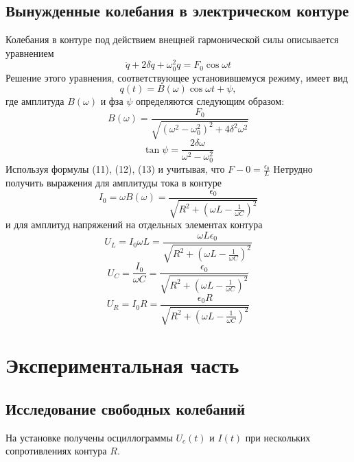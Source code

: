 \subsection{Вынужденные колебания в электрическом контуре} %
Колебания в контуре под действием внещней гармонической силы описывается уравнением
\begin{equation}
	\ddot{q}+2\delta\dot{q}+\omega_0^2 q= F_0\cos{\omega t}
\end{equation}
Решение этого уравнения, соответствующее установившемуся режиму, имеет вид
\begin{equation}
	q(t)=B(\omega)\cos{\omega t+\psi},
\end{equation}
где амплитуда $B(\omega)$ и фза $\psi$ определяются следующим образом:
\begin{equation}
	B(\omega)=\frac{F_0}{\sqrt{(\omega^2-\omega_0^2)^2+4\delta^2\omega^2}}
\end{equation}
\begin{equation}
	\tan{\psi}=\frac{2\delta\omega}{\omega^2-\omega_0^2}
\end{equation}
	Используя формулы (11), (12), (13) и учитывая, что $F-0=\frac{\epsilon_0}{L}$
Нетрудно получить выражения для амплитуды тока в контуре
\begin{equation}
	I_0=\omega B(\omega)=\frac{\epsilon_0}{\sqrt{R^2+(\omega L-\frac{1}{\omega C})^2}}
\end{equation}
и для амплитуд напряжений на отдельных элементах контура
\begin{equation}
	U_L=I_0\omega L=\frac{\omega L\epsilon_0}{\sqrt{R^2+(\omega L-\frac{1}{\omega C})^2}}
\end{equation}
\begin{equation}
	U_C=\frac{I_0}{\omega C}=\frac{\epsilon_0}{\sqrt{R^2+(\omega L-\frac{1}{\omega C})^2}}
\end{equation}
\begin{equation}
	U_R=I_0R=\frac{\epsilon_0R}{\sqrt{R^2+(\omega L-\frac{1}{\omega C})^2}}
\end{equation}

\newpage
\section{Экспериментальная часть}
\subsection{Исследование свободных колебаний}
На установке получены осциллограммы $U_c(t)$ и $I(t)$ при нескольких сопротивлениях контура $R$. 

